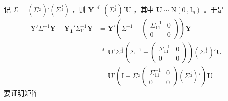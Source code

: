 \documentclass[12pt,hyperref,]{ctexart}
\begin{document}
记 \(\Sigma=(\Sigma^{\frac 12})'(\Sigma^{\frac 12})\) ，则
\(\boldsymbol{Y}\overset{d}{=}(\Sigma^{\frac 12})'\boldsymbol{U}\)
，其中 \(\boldsymbol{U}\sim\mathrm{N}(0\, ,\mathrm{I}_n)\) 。于是
\begin{equation*}
\begin{aligned}
\boldsymbol{Y}'\Sigma^{-1}\boldsymbol{Y}-\boldsymbol{Y_1}'\Sigma_{11}^{-1}\boldsymbol{Y} &= \boldsymbol{Y}'\left(
\Sigma^{-1}-
\begin{pmatrix}
\Sigma_{11}^{-1} & 0 \\
0 & 0
\end{pmatrix}
\right)\boldsymbol{Y} \\
&\overset{d}{=} \boldsymbol{U}'\Sigma^{\frac 12}\left(
\Sigma^{-1}-
\begin{pmatrix}
\Sigma_{11}^{-1} & 0 \\
0 & 0
\end{pmatrix}
\right)(\Sigma^{\frac 12})'\boldsymbol{U} \\
&= \boldsymbol{U}'\left(\mathrm{I}-\Sigma^{\frac 12}
\begin{pmatrix}
\Sigma_{11}^{-1} & 0 \\
0 & 0
\end{pmatrix}(\Sigma^{\frac 12})'
\right)\boldsymbol{U}
\end{aligned}
\end{equation*}要证明矩阵
\end{document}
